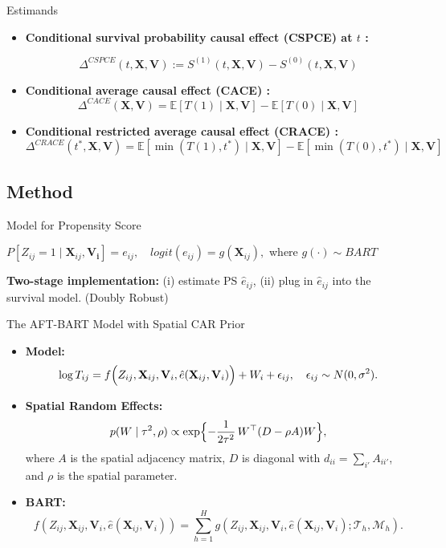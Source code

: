 \documentclass{beamer}
\begin{document}
\begin{frame}{Estimands}
\begin{itemize}
    \item \textbf{Conditional survival probability causal effect (CSPCE) at $t$ :} 

\[ \Delta^{CSPCE}(t,\mathbf{X},\mathbf{V}) := S^{(1)}(t,\mathbf{X},\mathbf{V}) - S^{(0)}(t,\mathbf{X},\mathbf{V}) \]


\item \textbf{Conditional average causal effect (CACE) :} 
\[\Delta^{CACE}(\mathbf{X},\mathbf{V}) = \mathbb{E}[T(1)\mid \mathbf{X},\mathbf{V}] - \mathbb{E}[T(0)\mid \mathbf{X},\mathbf{V}] \]
\item \textbf{Conditional restricted average causal effect (CRACE) :}
\[\Delta^{CRACE}(t^*,\mathbf{X},\mathbf{V}) = \mathbb{E}[\min(T(1), t^*)\mid \mathbf{X},\mathbf{V}] - \mathbb{E}[\min(T(0), t^*)\mid \mathbf{X},\mathbf{V}] \]

\end{itemize}
    
\end{frame}

\subsection{Method}
\begin{frame}{Model for Propensity Score}
   
  $P[Z_{ij}=1\mid \mathbf{X}_{ij},\mathbf{V_i}]=e_{ij}, \quad logit(e_{ij})=g(\mathbf{X}_{ij}),$ where $g(\cdot)\sim BART$
  
  
  
  \vspace{30pt}
  \textbf{Two-stage implementation:} (i) estimate PS $\hat{e}_{ij}$, (ii) plug in $\hat{e}_{ij}$ into the survival model. (Doubly Robust)
  
  \end{frame}


\begin{frame}{The AFT-BART Model with Spatial CAR Prior}
  \begin{itemize}
    \item \textbf{Model:} 
      \[
      \log T_{ij} = f\Bigl(Z_{ij},\mathbf{X}_{ij},\mathbf{V}_i,\hat{e}(\mathbf{X}_{ij},\mathbf{V}_i)\Bigr) + W_i + \epsilon_{ij},\quad \epsilon_{ij}\sim N(0,\sigma^2).
      \]
    \item \textbf{Spatial Random Effects:} 
      \[
      p(W\mid \tau^2,\rho) \propto \exp\Bigl\{-\frac{1}{2\tau^2}\,W^\top (D-\rho A)W\Bigr\},
      \]
      where \(A\) is the spatial adjacency matrix, \(D\) is diagonal with \(d_{ii}=\sum_{i'}A_{ii'}\), and \(\rho\) is the spatial parameter.
    \item \textbf{BART:} 
      \[
      f(Z_{ij},\mathbf{X}_{ij},\mathbf{V}_i,\hat{e}(\mathbf{X}_{ij},\mathbf{V}_i))=\sum_{h=1}^{H} g(Z_{ij},\mathbf{X}_{ij},\mathbf{V}_i,\hat{e}(\mathbf{X}_{ij},\mathbf{V}_i);\mathcal{T}_h,\mathcal{M}_h).
      \]
  \end{itemize}
\end{frame}
\end{document}
